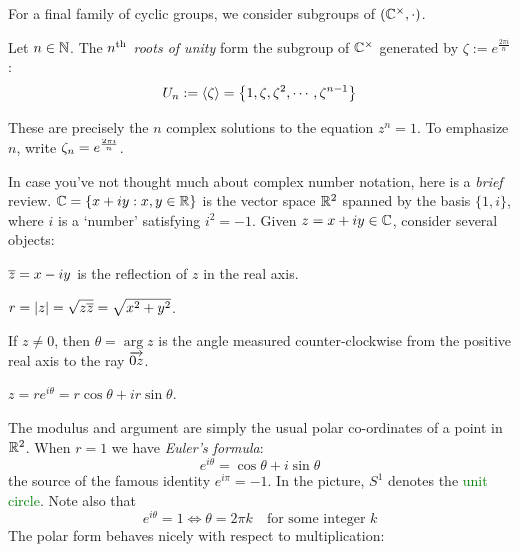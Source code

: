 
For a final family of cyclic groups, we consider subgroups of $(\mathbb{C}^\times,\cdot)$.

\begin{defn}{}{}
	Let $n\in\mathbb{N}$. The \emph{$n\textsuperscript{th}$ roots of unity} form the subgroup of $\mathbb{C}^\times$ generated by $\zeta:=e^{\frac{2\pi i}n}$:
	\[
		U_n:=\left\langle \zeta\right\rangle=\bigl\{1,\zeta,\zeta^2,\cdots,\zeta^{n-1}\bigr\}
	\]
\end{defn}

These are precisely the $n$ complex solutions to the equation $z^n=1$. To emphasize $n$, write $\zeta_n=\smash[t]{e^{\frac{2\pi i}n}}$. 


\begin{aside}
	
	In case you've not thought much about complex number notation, here is a \emph{brief} review. $\mathbb{C}=\{x+iy:x,y\in\mathbb{R}\}$ is the vector space $\mathbb{R}^2$ spanned by the basis $\{1,i\}$, where $i$ is a `number' satisfying $i^2=-1$. 
	Given $z=x+iy\in\mathbb{C}$, consider several objects:\par
	\begin{minipage}[t]{0.7\textwidth}\vspace{-4pt}
		\begin{description}\itemsep0pt
			\item[\normalfont\emph{Complex conjugate}:] $\overline{z}=x-iy$ is the reflection of $z$ in the real axis.
			\item[\normalfont\emph{Modulus (length)}:] $r=\left| z\right|=\sqrt{z\overline{z}}=\sqrt{x^2+y^2}$.
			\item[\normalfont\emph{Argument (angle)}:] If $z\neq 0$, then $\theta=\arg z$ is the angle measured counter-clockwise from the positive real axis to the ray $\overrightarrow{0z}$.
			\item[\normalfont\emph{Polar form}:] $z=re^{i\theta} =r\cos\theta+ir\sin\theta$.
	\end{description}\vspace{-7pt}
	The modulus and argument are simply the usual polar co-ordinates of a point in $\mathbb{R}^2$. When $r=1$ we have \emph{Euler's formula}:
	\[
		e^{i\theta}=\cos\theta+i\sin\theta
	\]
	the source of the famous identity $\displaystyle e^{i\pi}=-1$. In the picture, $S^1$ denotes the \textcolor{Green}{unit circle}. Note also that\vspace{-2pt}
	\[
		e^{i\theta}=1\iff \theta=2\pi k\quad\text{for some integer $k$}\tag{$\dag$}
	\]
	The polar form behaves nicely with respect to multiplication:\vspace{-2pt}

\end{minipage}
\end{aside}

